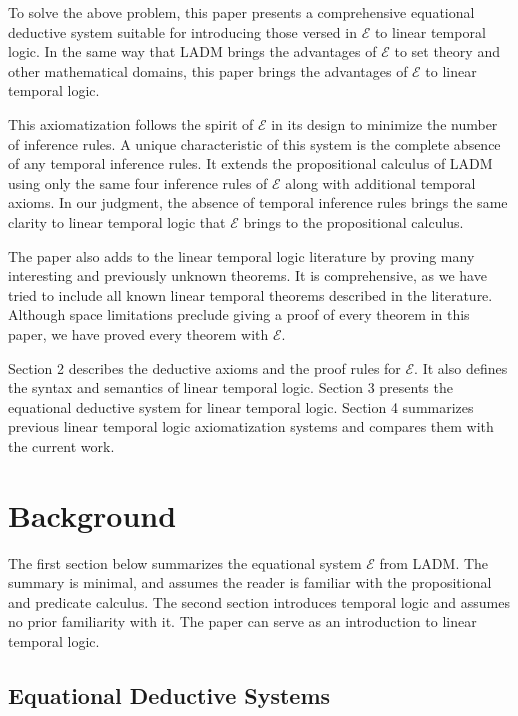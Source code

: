 \documentclass[12pt, fleqn, leqno]{article}
\begin{document}
To solve the above problem, this paper presents a comprehensive equational deductive system suitable for introducing those versed in $\mathcal{E}$ to linear temporal logic.
In the same way that LADM brings the advantages of $\mathcal{E}$ to set theory and other mathematical domains, this paper brings the advantages of $\mathcal{E}$ to linear temporal logic.

This axiomatization follows the spirit of $\mathcal{E}$ in its design to minimize the number of inference rules.
A unique characteristic of this system is the complete absence of any temporal inference rules.
It extends the propositional calculus of LADM using only the same four inference rules of $\mathcal{E}$ along with additional temporal axioms.
In our judgment, the absence of temporal inference rules brings the same clarity to linear temporal logic that $\mathcal{E}$ brings to the propositional calculus.

The paper also adds to the linear temporal logic literature by proving many interesting and previously unknown theorems.
It is comprehensive, as we have tried to include all known linear temporal theorems described in the literature.
Although space limitations preclude giving a proof of every theorem in this paper, we have proved every theorem with $\mathcal{E}$.

Section 2 describes the deductive axioms and the proof rules for $\mathcal{E}$.
It also defines the syntax and semantics of linear temporal logic.
Section 3 presents the equational deductive system for linear temporal logic.
Section 4 summarizes previous linear temporal logic axiomatization systems and compares them with the current work.

\section{Background}

The first section below summarizes the equational system $\mathcal{E}$ from LADM.
The summary is minimal, and assumes the reader is familiar with the propositional and predicate calculus.
The second section introduces temporal logic and assumes no prior familiarity with it.
The paper can serve as an introduction to linear temporal logic.

\subsection{Equational Deductive Systems}\label{sec-equational-deductive-systems}
\end{document}
